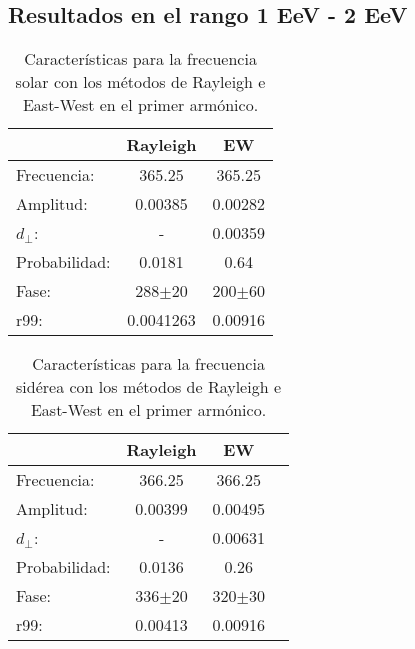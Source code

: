 \subsection*{Resultados en el rango 1 EeV - 2 EeV}
    \begin{table}[H]
        \begin{small}
            \begin{center}
                \begin{tabular}[c]{l|c|c}
                                    & Rayleigh      & EW                \\\hline
                    Frecuencia:     & 365.25	    & 365.25            \\
                    Amplitud:       & 0.00385       & 0.00282           \\
                    $d_\perp$:      & -	            & 0.00359	        \\ 
                    Probabilidad:   & 0.0181        & 0.64              \\
                    Fase:           & 288$\pm$20    & 200$\pm$60        \\
                    r99:            & 0.0041263     & 0.00916           \\
                \end{tabular}
            \end{center}
        \end{small}
        \caption{Características para la frecuencia solar con los métodos de Rayleigh  e East-West en el primer armónico.}
        \label{tab:solar}
    \end{table}

    \begin{table}[H]
        \begin{small}
            \begin{center}
                \begin{tabular}[c]{l|c|c|c}
                                    & Rayleigh     & EW         &       \\\hline
                    Frecuencia:     & 366.25	   & 366.25     &       \\
                    Amplitud:       & 0.00399	   &0.00495     &       \\
                    $d_\perp$:      & -	           & 0.00631    &       \\ 
                    Probabilidad:   & 0.0136	   &0.26        &       \\
                    Fase:           & 336$\pm$20   &320$\pm$30  &       \\
                    r99:            & 0.00413	   &0.00916     &       \\
                \end{tabular}
            \end{center}
        \end{small}
        \caption{Características para la frecuencia sidérea con los métodos de Rayleigh  e East-West en el primer armónico.}
        \label{tab:solar}
    \end{table}

    

